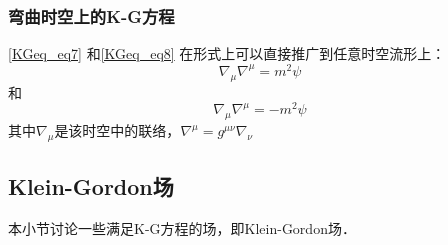 \subsubsection{弯曲时空上的K-G方程}

\autoref{KGeq_eq7} 和\autoref{KGeq_eq8} 在形式上可以直接推广到任意时空流形上：
\begin{equation}
\nabla_\mu\nabla^\mu=m^2\psi
\end{equation}
和
\begin{equation}
\nabla_\mu\nabla^\mu=-m^2\psi
\end{equation}
其中$\nabla_\mu$是该时空中的联络，$\nabla^\mu=g^{\mu\nu}\nabla_\nu$





\subsection{Klein-Gordon场}

本小节讨论一些满足K-G方程的场，即Klein-Gordon场．


























